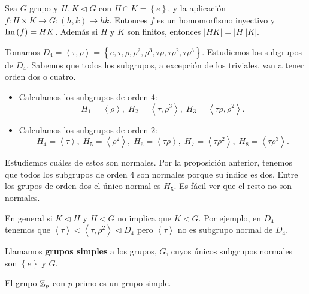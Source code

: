\begin{observation}
	Sea $\displaystyle G $ grupo y $\displaystyle H,K \lhd G $ con $\displaystyle H \cap K = \left\{ e\right\}  $, y la aplicación $\displaystyle f : H \times K \to G : \left(h,k\right) \to hk $. Entonces $\displaystyle f $ es un homomorfismo inyectivo y $\displaystyle \operatorname{Im}\left(f\right) = HK $. Además si $\displaystyle H $ y $\displaystyle K $ son finitos, entonces $\displaystyle \left|HK\right| = \left|H\right| \left|K\right| $. 
\end{observation}
\begin{eg}
	Tomamos $\displaystyle D_{4} = \left\langle \tau, \rho \right\rangle = \left\{ e, \tau, \rho, \rho^{2}, \rho^{3}, \tau\rho, \tau\rho^{2}, \tau\rho^{3}\right\} $. Estudiemos los subgrupos de $\displaystyle D_{4} $. Sabemos que todos los subgrupos, a excepción de los triviales, van a tener orden dos o cuatro. 
	\begin{itemize}
	\item Calculamos los subgrupos de orden 4:
		\[H_{1} = \left\langle \rho \right\rangle, \; H_{2} = \left\langle \tau, \rho^{3} \right\rangle , \; H_{3} = \left\langle \tau\rho, \rho^{2} \right\rangle  .\]
	\item Calculamos los subgrupos de orden 2:
		\[H_{4} = \left\langle \tau \right\rangle , \; H_{5} = \left\langle \rho^{2} \right\rangle , \; H_{6} = \left\langle \tau \rho \right\rangle , \; H_{7} = \left\langle \tau\rho^{2} \right\rangle , \; H_{8} = \left\langle \tau\rho^{3} \right\rangle  .\]
	\end{itemize}
	Estudiemos cuáles de estos son normales. Por la proposición anterior, tenemos que todos los subgrupos de orden 4 son normales porque su índice es dos. Entre los grupos de orden dos el único normal es $\displaystyle H_{5} $. Es fácil ver que el resto no son normales. 
\end{eg}
\begin{observation}
En general si $\displaystyle K \lhd H$ y $\displaystyle H \lhd G $ no implica que $\displaystyle K\lhd G $. Por ejemplo, en $\displaystyle D_{4} $ tenemos que $\displaystyle \left\langle \tau \right\rangle \lhd \left\langle \tau, \rho^{2} \right\rangle \lhd D_{4} $ pero $\displaystyle \left\langle \tau \right\rangle  $ no es subgrupo normal de $\displaystyle D_{4} $. 
\end{observation}
\begin{definition}
	Llamamos \textbf{grupos simples} a los grupos, $\displaystyle G $, cuyos únicos subgrupos normales son $\displaystyle \left\{ e\right\}  $ y $\displaystyle G $. 
\end{definition}
\begin{eg}
El grupo $\displaystyle \mathbb{Z}_{p} $ con $\displaystyle p $ primo es un grupo simple.
\end{eg}

